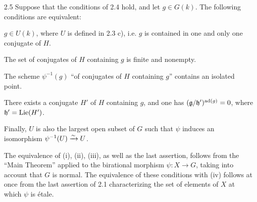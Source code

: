 \begin{corollary}{2.5}\label{XIII.2.5}
Suppose that the conditions of 2.4 hold, and let $g\in G(k)$.
The following conditions are equivalent:
\begin{enumeratei}
\item $g\in U(k)$, where $U$ is defined in 2.3 c), i.e. $g$ is contained
in one and only one conjugate of $H$.
\item The set of conjugates of $H$ containing $g$ is finite and nonempty.
\item The scheme $\psi^{-1}(g)$ ``of conjugates of $H$ containing $g$''
contains an isolated point.
\item There exists a conjugate $H'$ of $H$ containing $g$, and one has
$(\mathfrak g/\mathfrak h')^{\operatorname{ad}(g)}=0$, where $\mathfrak h'=\operatorname{Lie}(H')$.
\end{enumeratei}
Finally, $U$ is also the largest open subset of $G$ such that $\psi$
induces an isomorphism $\psi^{-1}(U)\xrightarrow{\sim} U$.
\end{corollary}
The equivalence of (i), (ii), (iii), as well as the last assertion,
follows from the ``Main Theorem'' applied to the
birational morphism $\psi:X\to G$, taking into account that $G$ is normal.
The equivalence of these conditions with (iv) follows at once from the
last assertion of 2.1 characterizing the set of elements of $X$ at which
$\psi$ is \'etale.

